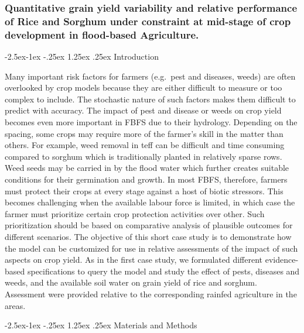 \documentclass[12pt,oneside]{article}
\makeatletter
\renewcommand\paragraph{\@startsection{paragraph}{4}{\z@}%
            {-2.5ex\@plus -1ex \@minus -.25ex}%
            {1.25ex \@plus .25ex}%
            {\normalfont\normalsize\bfseries}}
\makeatother
\begin{document}
\hypertarget{IV23}{%
\subsubsection{Quantitative grain yield variability and relative performance of Rice and Sorghum under constraint at mid-stage of crop development in flood-based Agriculture.}\label{IV23}}

\hypertarget{IV231}{%
\paragraph{Introduction}\label{IV231}}

Many important risk factors for farmers (e.g.~pest and diseases, weeds) are often overlooked by crop models because they are either difficult to measure or too complex to include. The stochastic nature of such factors makes them difficult to predict with accuracy. The impact of pest and disease or weeds on crop yield becomes even more important in FBFS due to their hydrology. Depending on the spacing, some crops may require more of the farmer's skill in the matter than others. For example, weed removal in teff can be difficult and time consuming compared to sorghum which is traditionally planted in relatively sparse rows. Weed seeds may be carried in by the flood water which further creates suitable conditions for their germination and growth. In most FBFS, therefore, farmers must protect their crops at every stage against a host of biotic stressors. This becomes challenging when the available labour force is limited, in which case the farmer must prioritize certain crop protection activities over other. Such prioritization should be based on comparative analysis of plausible outcomes for different scenarios. The objective of this short case study is to demonstrate how the model can be customized for use in relative assessments of the impact of such aspects on crop yield. As in the first case study, we formulated different evidence-based specifications to query the model and study the effect of pests, diseases and weeds, and the available soil water on grain yield of rice and sorghum. Assessment were provided relative to the corresponding rainfed agriculture in the areas.

\hypertarget{IV232}{%
\paragraph{Materials and Methods}\label{IV232}}
\end{document}
